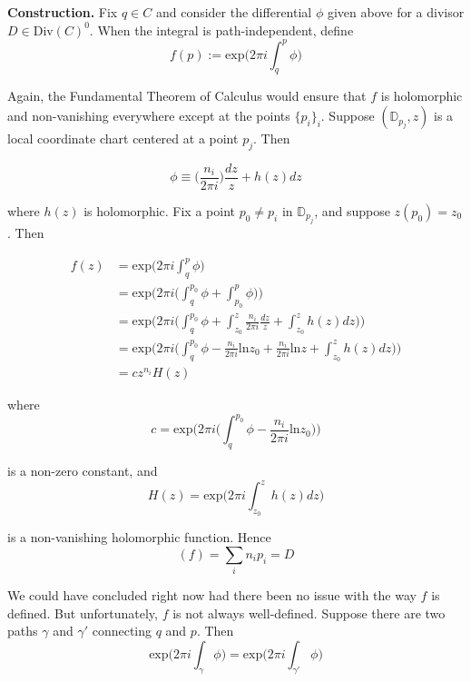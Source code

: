 \documentclass[11pt,a4paper]{article}
\begin{document}

\textbf{Construction.} Fix $q\in C$ and consider the differential $\phi$ given above for a divisor $D \in \text{Div}(C)^0$. When the integral is path-independent, define
$$f(p) := \text{exp}\bigg(2\pi i\int_{q}^{p}\phi\bigg)$$

Again, the Fundamental Theorem of Calculus would ensure that $f$ is holomorphic and non-vanishing everywhere except at the points $\{p_i\}_i$. Suppose $(\mathbb{D}_{p_j}, z)$ is a local coordinate chart centered at a point $p_j$. Then

$$\phi \equiv \bigg(\frac{n_i}{2\pi i}\bigg)\frac{dz}{z} + h(z)dz$$

where $h(z)$ is holomorphic. Fix a point $p_0 \neq p_i$ in $\mathbb{D}_{p_j}$, and suppose $z(p_0) = z_0$. Then


\begin{equation*}
    \begin{aligned}
        f(z) &= \text{exp}\bigg(2\pi i\int_{q}^{p}\phi\bigg)\\
            &= \text{exp}\bigg(2\pi i\bigg(\int_{q}^{p_0}\phi + \int_{p_0}^{p}\phi\bigg)\bigg)\\
            &= \text{exp}\bigg(2\pi i\bigg(\int_{q}^{p_0}\phi + \int_{z_0}^{z}{\frac{n_i}{2\pi i}\frac{dz}{z}} + \int_{z_0}^{z}h(z)dz\bigg)\bigg)\\
            &= \text{exp}\bigg(2\pi i\bigg(\int_{q}^{p_0}\phi - \frac{n_i}{2\pi i}\text{ln}z_0 + \frac{n_i}{2\pi i}\text{ln}z + \int_{z_0}^{z}h(z)dz\bigg)\bigg)\\
            &= cz^{n_i}H(z)
    \end{aligned}
\end{equation*}

where
$$c = \text{exp}\bigg(2\pi i\bigg(\int_{q}^{p_0}\phi - \frac{n_i}{2\pi i}\text{ln}z_0 \bigg)\bigg)$$

is a non-zero constant, and
$$H(z) = \text{exp}\bigg(2\pi i \int_{z_0}^{z}h(z)dz\bigg)$$

is a non-vanishing holomorphic function. Hence
$$(f) = \sum_{i}n_ip_i = D$$

We could have concluded right now had there been no issue with the way $f$ is defined. But unfortunately, $f$ is not always well-defined. Suppose there are two paths $\gamma$ and $\gamma'$ connecting $q$ and $p$. Then
$$\text{exp}\bigg(2\pi i\int_{\gamma}\phi\bigg) = \text{exp}\bigg(2\pi i\int_{\gamma'}\phi\bigg)$$
\end{document}
